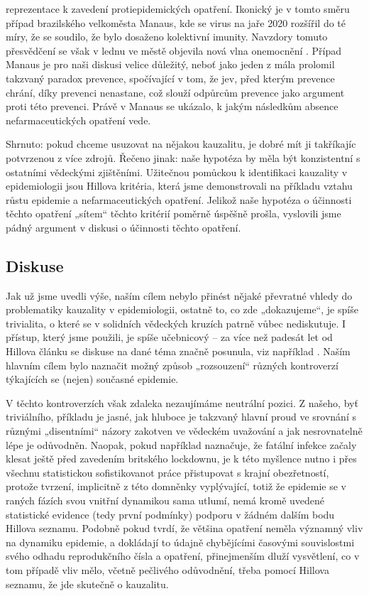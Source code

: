 \begin{enumerate}
reprezentace k zavedení protiepidemických opatření. Ikonický je v
tomto směru případ brazilského velkoměsta Manaus, kde se virus na
jaře 2020 rozšířil do té míry, že se soudilo, že bylo dosaženo kolektivní
imunity. Navzdory tomuto přesvědčení se však v lednu ve městě objevila
nová vlna onemocnění \cite{sabino2021resurgence}. 
Případ Manaus je pro naši diskusi velice důležitý, neboť jako jeden z mála
prolomil takzvaný paradox prevence, spočívající v tom, že jev, před kterým prevence chrání, díky prevenci nenastane, což slouží odpůrcům prevence jako argument proti této prevenci. Právě v Manaus se ukázalo, k jakým následkům absence nefarmaceutických opatření vede.

\end{enumerate}
Shrnuto: pokud chceme usuzovat na nějakou kauzalitu, je dobré mít ji takříkajíc potvrzenou z více zdrojů. Řečeno jinak: naše hypotéza by měla být konzistentní s ostatními vědeckými zjištěními. Užitečnou pomůckou k identifikaci kauzality v epidemiologii jsou Hillova kritéria, která jsme demonstrovali na příkladu vztahu růstu epidemie a nefarmaceutických opatření. Jelikož naše hypotéza o účinnosti těchto opatření „sítem“ těchto kritérií poměrně úspěšně prošla, vyslovili jsme pádný argument v diskusi o účinnosti těchto opatření.

\subsection*{Diskuse}

Jak už jsme uvedli výše, naším cílem nebylo přinést nějaké převratné
vhledy do problematiky kauzality v epidemiologii, ostatně to, co zde
„dokazujeme“, je spíše trivialita, o které se v solidních vědeckých
kruzích patrně vůbec nediskutuje. I přístup, který jsme použili, je
spíše učebnicový -- za více než padesát let od Hillova článku se
diskuse na dané téma značně posunula, viz například \cite{rothman2005causation}.
Naším hlavním cílem bylo naznačit možný způsob „rozsouzení“ různých kontroverzí týkajících se (nejen) současné epidemie. 

V těchto kontroverzích však zdaleka nezaujímáme neutrální pozici. Z našeho, byť triviálního, příkladu je jasné, jak hluboce je takzvaný hlavní proud ve srovnání s různými „disentními“
názory zakotven ve vědeckém uvažování a jak nesrovnatelně lépe je
odůvodněn. Naopak, pokud například \cite{wood2021inferring} naznačuje, že fatální infekce
začaly klesat ještě před zavedením britského lockdownu, je k této
myšlence nutno i přes všechnu statistickou sofistikovanot práce přistupovat
s krajní obezřetností, protože tvrzení, implicitně z této domněnky
vyplývající, totiž že epidemie se v raných fázích svou vnitřní dynamikou
sama utlumí, nemá kromě uvedené statistické evidence (tedy první podmínky) podporu v žádném dalším bodu Hillova seznamu. Podobně pokud \cite{KomarekStraka2021} tvrdí, že většina opatření neměla významný vliv na dynamiku epidemie, a dokládají to údajně chybějícími časovými souvislostmi svého odhadu reprodukčního čísla a opatření, přinejmenším dluží vysvětlení, co v tom případě vliv mělo, včetně pečlivého odůvodnění, třeba pomocí Hillova seznamu, že jde skutečně o kauzalitu.
